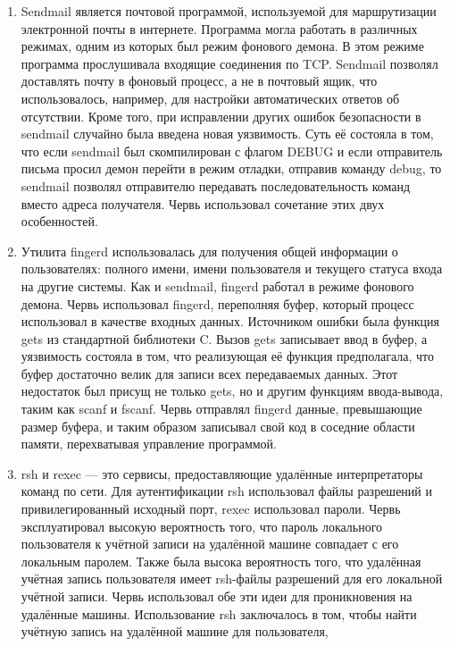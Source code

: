 \documentclass[
  english,
  russian,
  12pt,
  a4paper,
]{phdthesr}
\begin{document}
\begin{enumerate}
\def\labelenumi{\arabic{enumi}.}
\item
  Sendmail является почтовой программой, используемой для маршрутизации
  электронной почты в интернете. Программа могла работать в различных
  режимах, одним из которых был режим фонового демона. В этом режиме
  программа прослушивала входящие соединения по TCP. Sendmail позволял
  доставлять почту в фоновый процесс, а не в почтовый ящик, что
  использовалось, например, для настройки автоматических ответов об
  отсутствии. Кроме того, при исправлении других ошибок безопасности в
  sendmail случайно была введена новая уязвимость. Суть её состояла в
  том, что если sendmail был скомпилирован с флагом DEBUG и если
  отправитель письма просил демон перейти в режим отладки, отправив
  команду debug, то sendmail позволял отправителю передавать
  последовательность команд вместо адреса получателя. Червь использовал
  сочетание этих двух особенностей.
\item
  Утилита fingerd использовалась для получения общей информации о
  пользователях: полного имени, имени пользователя и текущего статуса
  входа на другие системы. Как и sendmail, fingerd работал в режиме
  фонового демона. Червь использовал fingerd, переполняя буфер, который
  процесс использовал в качестве входных данных. Источником ошибки была
  функция gets из стандартной библиотеки C. Вызов gets записывает ввод в
  буфер, а уязвимость состояла в том, что реализующая её функция
  предполагала, что буфер достаточно велик для записи всех передаваемых
  данных. Этот недостаток был присущ не только gets, но и другим
  функциям ввода-вывода, таким как scanf и fscanf. Червь отправлял
  fingerd данные, превышающие размер буфера, и таким образом записывал
  свой код в соседние области памяти, перехватывая управление
  программой.
\item
  rsh и rexec --- это сервисы, предоставляющие удалённые интерпретаторы
  команд по сети. Для аутентификации rsh использовал файлы разрешений и
  привилегированный исходный порт, rexec использовал пароли. Червь
  эксплуатировал высокую вероятность того, что пароль локального
  пользователя к учётной записи на удалённой машине совпадает с его
  локальным паролем. Также была высока вероятность того, что удалённая
  учётная запись пользователя имеет rsh-файлы разрешений для его
  локальной учётной записи. Червь использовал обе эти идеи для
  проникновения на удалённые машины. Использование rsh заключалось в
  том, чтобы найти учётную запись на удалённой машине для пользователя,

\end{enumerate}
\end{document}

